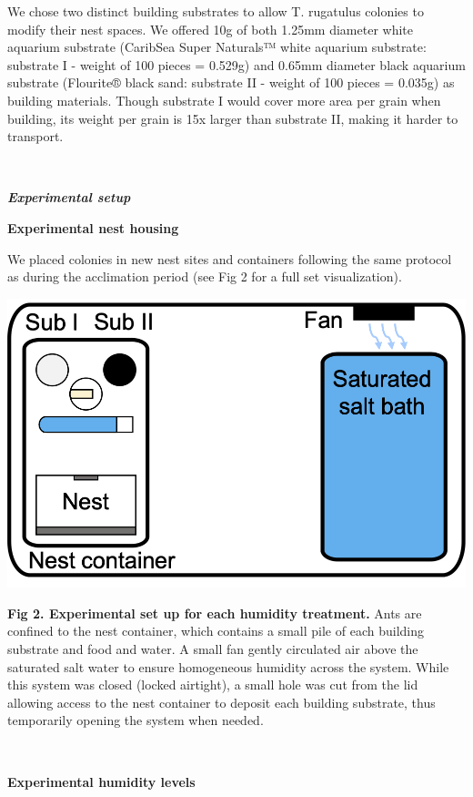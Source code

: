 \documentclass[3p]{elsarticle} %
\begin{document}
We chose two distinct building substrates to allow T. rugatulus colonies
to modify their nest spaces. We offered 10g of both 1.25mm diameter
white aquarium substrate (CaribSea Super Naturals™ white aquarium
substrate: substrate I - weight of 100 pieces = 0.529g) and 0.65mm
diameter black aquarium substrate (Flourite® black sand: substrate II -
weight of 100 pieces = 0.035g) as building materials. Though substrate I
would cover more area per grain when building, its weight per grain is
15x larger than substrate II, making it harder to transport.

~

\textbf{\emph{Experimental setup}}

\textbf{Experimental nest housing}

We placed colonies in new nest sites and containers following the same
protocol as during the acclimation period (see Fig 2 for a full set
visualization).

\begin{flushleft}\includegraphics[width=0.75\linewidth,height=0.37\textheight]{../figures/Fig2} \end{flushleft}

\textbf{Fig 2. Experimental set up for each humidity treatment.} Ants
are confined to the nest container, which contains a small pile of each
building substrate and food and water. A small fan gently circulated air
above the saturated salt water to ensure homogeneous humidity across the
system. While this system was closed (locked airtight), a small hole was
cut from the lid allowing access to the nest container to deposit each
building substrate, thus temporarily opening the system when needed.

~

\textbf{Experimental humidity levels}
\end{document}
